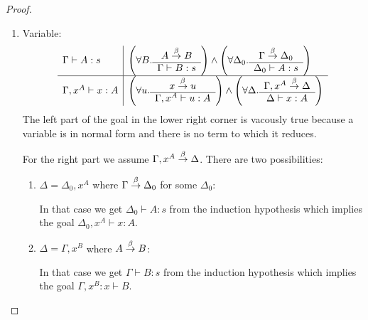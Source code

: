 \begin{theorem}
{\begin{proof}
\begin{enumerate}
\begin{enumerate}
                \item Variable:
                    $$
                    \begin{array}{l|l}
                        \Gamma \vdash A : s
                        &
                        \left( \forall B. \begin{array}{c} A \stackrel{\beta}{\to} B \\ \hline \Gamma \vdash B: s\end{array} \right)
                        \land
                        \left( \forall \Delta_0. \begin{array}{c} \Gamma \stackrel{\beta}{\to} \Delta_0 \\ \hline \Delta_0 \vdash A: s\end{array} \right)
                        \\
                        \hline
                        \Gamma, x^A \vdash x: A
                        &
                        \left( \forall u. \begin{array}{c} x \stackrel{\beta}{\to} u \\ \hline \Gamma,x^A \vdash u: A\end{array} \right)
                        \land
                        \left( \forall \Delta. \begin{array}{c} \Gamma,x^A \stackrel{\beta}{\to} \Delta \\ \hline \Delta \vdash x: A\end{array} \right)
                    \end{array}
                    $$
                    The left part of the goal in the lower right corner is
                    vacously true because a variable is in normal form and there
                    is no term to which it reduces.

                    For the right part we assume $\Gamma,x^A \stackrel{\beta}{\to} \Delta$.
                    There are two possibilities:
                    \begin{enumerate}
                        \item $\Delta = \Delta_0,x^A$ where $\Gamma \stackrel{\beta}{\to}
                            \Delta_0$ for some $\Delta_0$:

                        In that case we get $\Delta_0 \vdash A: s$ from the
                            induction hypothesis which implies the goal
                            $\Delta_0,x^A \vdash x: A$.

                        \item $\Delta = \Gamma,x^B$ where $A \stackrel{\beta}{\to} B$:

                        In that case we get $\Gamma \vdash B : s$ from the
                            induction hypothesis which implies the goal
                            $\Gamma,x^B: x \vdash B$.
                    \end{enumerate}


\end{enumerate}
\end{enumerate}
\end{proof}}
\end{theorem}
